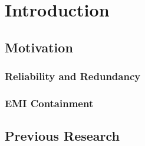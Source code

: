 \chapter{Introduction}

\section{Motivation}

\subsection{Reliability and Redundancy}

\subsection{EMI Containment}

\section{Previous Research}
